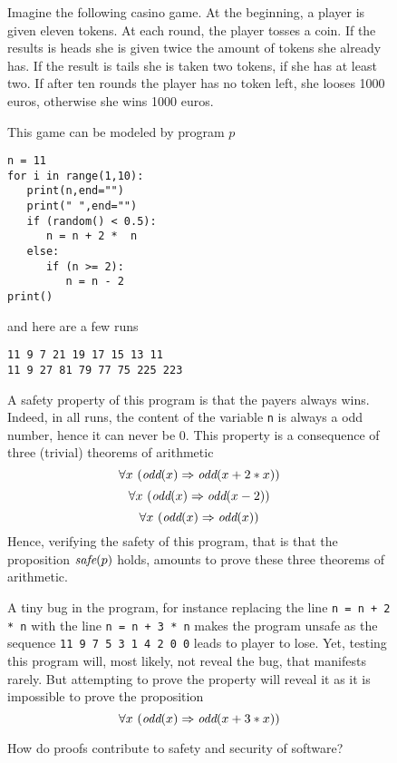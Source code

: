 \begin{figure}
\begin{framed}
Imagine the following casino game. At the beginning, a player is given
eleven tokens. At each round, the player tosses a coin. If the results
is heads she is given twice the amount of tokens she already has. If
the result is tails she is taken two tokens, if she has at least two.
If after ten rounds the player has no token left, she looses 1000
euros, otherwise she wins 1000 euros.

This game can be modeled by program $p$
\begin{verbatim}
n = 11
for i in range(1,10):
   print(n,end="")
   print(" ",end="")
   if (random() < 0.5):
      n = n + 2 *  n
   else:
      if (n >= 2):
         n = n - 2
print()
\end{verbatim}
and here are a few runs
\begin{verbatim}
11 9 7 21 19 17 15 13 11
11 9 27 81 79 77 75 225 223 
\end{verbatim}
A safety property of this program is that the payers always wins.
Indeed, in all runs, the content of the variable {\tt n} is always a
odd number, hence it can never be $0$. This property is a consequence
of three (trivial) theorems of arithmetic
$$\forall x~(\mbox{\it odd}(x) \Rightarrow \mbox{\it odd}(x + 2 * x))$$
$$\forall x~(\mbox{\it odd}(x) \Rightarrow \mbox{\it odd}(x - 2))$$
$$\forall x~(\mbox{\it odd}(x) \Rightarrow \mbox{\it odd}(x))$$
Hence, verifying the safety of this program, that is that the
proposition 
${\mbox{\it safe}}(p)$ holds, 
amounts to prove these three theorems of arithmetic.

A tiny bug in the program, for instance replacing the line {\tt n = n
+ 2 * n} with the line {\tt n = n + 3 * n} makes the program unsafe
as the sequence {\tt 11 9 7 5 3 1 4 2 0 0} leads to player to
lose. Yet, testing this program will, most likely, not reveal the bug,
that manifests rarely.  But attempting to prove the property will
reveal it as it is impossible to prove the proposition
$$\forall x~(\mbox{\it odd}(x) \Rightarrow \mbox{\it odd}(x + 3 * x))$$
\caption{How do proofs contribute to safety and security of software?\label{safety}}
\end{framed}
\end{figure}

